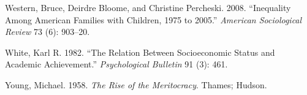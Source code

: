\documentclass[
]{article}
\newlength{\cslhangindent}
\newlength{\cslentryspacingunit} %
\newenvironment{CSLReferences}[2] %
 {%
  \setlength{\parindent}{0pt}
  \ifodd #1
  \let\oldpar\par
  \def\par{\hangindent=\cslhangindent\oldpar}
  \fi
  \setlength{\parskip}{#2\cslentryspacingunit}
 }%
 {}
\theoremstyle{definition}
\theoremstyle{definition}
\theoremstyle{definition}
\theoremstyle{definition}
\theoremstyle{remark}
\begin{document}
\begin{CSLReferences}{1}{0}
\leavevmode{}%
Western, Bruce, Deirdre Bloome, and Christine Percheski. 2008. {``Inequality Among American Families with Children, 1975 to 2005.''} \emph{American Sociological Review} 73 (6): 903--20.

\leavevmode{}%
White, Karl R. 1982. {``The Relation Between Socioeconomic Status and Academic Achievement.''} \emph{Psychological Bulletin} 91 (3): 461.

\leavevmode{}%
Young, Michael. 1958. \emph{The Rise of the Meritocracy}. Thames; Hudson.

\end{CSLReferences}
\end{document}

